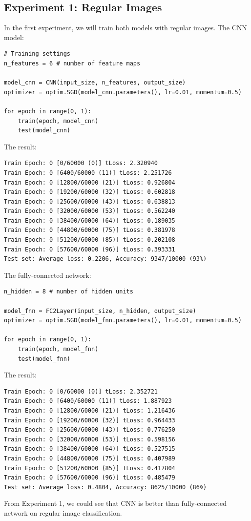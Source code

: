         \subsection{Experiment 1: Regular Images}
        In the first experiment, we will train both models with regular images.
        The CNN model:
        \begin{verbatim}
# Training settings 
n_features = 6 # number of feature maps

model_cnn = CNN(input_size, n_features, output_size)
optimizer = optim.SGD(model_cnn.parameters(), lr=0.01, momentum=0.5)

for epoch in range(0, 1):
    train(epoch, model_cnn)
    test(model_cnn)
        \end{verbatim}
        The result:
        \begin{verbatim}
Train Epoch: 0 [0/60000 (0)] tLoss: 2.320940
Train Epoch: 0 [6400/60000 (11)] tLoss: 2.251726
Train Epoch: 0 [12800/60000 (21)] tLoss: 0.926804
Train Epoch: 0 [19200/60000 (32)] tLoss: 0.602818
Train Epoch: 0 [25600/60000 (43)] tLoss: 0.638813
Train Epoch: 0 [32000/60000 (53)] tLoss: 0.562240
Train Epoch: 0 [38400/60000 (64)] tLoss: 0.189035
Train Epoch: 0 [44800/60000 (75)] tLoss: 0.381978
Train Epoch: 0 [51200/60000 (85)] tLoss: 0.202108
Train Epoch: 0 [57600/60000 (96)] tLoss: 0.393331
Test set: Average loss: 0.2206, Accuracy: 9347/10000 (93%)
        \end{verbatim}
        The fully-connected network:
        \begin{verbatim}
n_hidden = 8 # number of hidden units

model_fnn = FC2Layer(input_size, n_hidden, output_size)
optimizer = optim.SGD(model_fnn.parameters(), lr=0.01, momentum=0.5)

for epoch in range(0, 1):
    train(epoch, model_fnn)
    test(model_fnn)
        \end{verbatim}
        The result:
        \begin{verbatim}
Train Epoch: 0 [0/60000 (0)] tLoss: 2.352721
Train Epoch: 0 [6400/60000 (11)] tLoss: 1.887923
Train Epoch: 0 [12800/60000 (21)] tLoss: 1.216436
Train Epoch: 0 [19200/60000 (32)] tLoss: 0.964433
Train Epoch: 0 [25600/60000 (43)] tLoss: 0.776250
Train Epoch: 0 [32000/60000 (53)] tLoss: 0.598156
Train Epoch: 0 [38400/60000 (64)] tLoss: 0.527515
Train Epoch: 0 [44800/60000 (75)] tLoss: 0.407989
Train Epoch: 0 [51200/60000 (85)] tLoss: 0.417804
Train Epoch: 0 [57600/60000 (96)] tLoss: 0.485479
Test set: Average loss: 0.4804, Accuracy: 8625/10000 (86%)
        \end{verbatim}
        From Experiment 1, we could see that CNN is better than fully-connected network on regular image classification.

